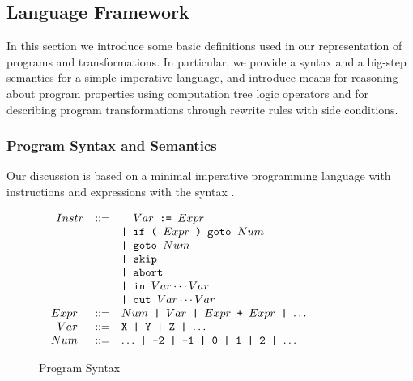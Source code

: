 \subsection{Language Framework}

In this section we introduce some basic definitions used in our representation of programs and transformations. In particular, we provide a syntax and a big-step semantics for a simple imperative language, and introduce means for reasoning about program properties using computation tree logic operators and for describing program transformations through rewrite rules with side conditions.

\subsubsection*{Program Syntax and Semantics}

Our discussion is based on a minimal imperative programming language with instructions and expressions with the syntax .

\ifdefined\noauthorea
\begin{figure}[t]
\fi
\noindent
\begin{small}
$
\begin{array}{rcl}
\texttt{$Instr$} & ::= & \hphantom{\texttt{| }}\texttt{$Var$ := $Expr$} \\
& & \texttt{| if ( $Expr$ ) goto $Num$} \\
& & \texttt{| goto $Num$} \\
& & \texttt{| skip} \\
& & \texttt{| abort} \\
& & \texttt{| in $Var\cdots Var$} \\ 
& & \texttt{| out $Var\cdots Var$} \\
\texttt{ $Expr$ } & ::= & \texttt{$Num$ | $Var$ | $Expr$ + $Expr$ | $\ldots$ } \\
\texttt{ $Var$ } & ::= & \texttt{X | Y | Z | $\ldots$} \\
\texttt{ $Num$ } & ::= & \texttt{$\ldots$ | -2 | -1 | 0 | 1 | 2 | $\ldots$} \\
\end{array}
$
\end{small}
\ifdefined\noauthorea
\caption{\label{fig:osr-program-syntax}Program Syntax}
\end{figure}
\fi

